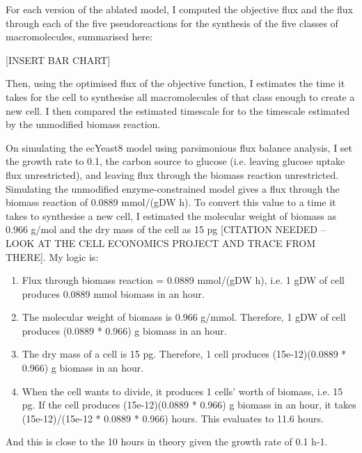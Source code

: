 For each version of the ablated model, I computed the objective flux and the flux through each of the five pseudoreactions for the synthesis of the five classes of macromolecules, summarised here:

[INSERT BAR CHART]

Then, using the optimised flux of the objective function, I estimates the time it takes for the cell to synthesise all macromolecules of that class enough to create a new cell.
I then compared the estimated timescale for to the timescale estimated by the unmodified biomass reaction.

On simulating the ecYeast8 model using parsimonious flux balance analysis, I set the growth rate to 0.1, the carbon source to glucose (i.e. leaving glucose uptake flux unrestricted), and leaving flux through the biomass reaction unrestricted.
Simulating the unmodified enzyme-constrained model gives a flux through the biomass reaction of 0.0889 mmol/(gDW h).
To convert this value to a time it takes to synthesise a new cell, I estimated the molecular weight of biomass as 0.966 g/mol \parencite{takhaveevTemporalSegregationBiosynthetic2023} and the dry mass of the cell as 15 pg [CITATION NEEDED -- LOOK AT THE CELL ECONOMICS PROJECT AND TRACE FROM THERE].
My logic is:
\begin{enumerate}
   \item Flux through biomass reaction = 0.0889 mmol/(gDW h), i.e. 1 gDW of cell produces 0.0889 mmol biomass in an hour.
   \item The molecular weight of biomass is 0.966 g/mmol.  Therefore, 1 gDW of cell produces (0.0889 * 0.966) g biomass in an hour.
   \item The dry mass of a cell is 15 pg.  Therefore, 1 cell produces (15e-12)(0.0889 * 0.966) g biomass in an hour.
   \item When the cell wants to divide, it produces 1 cells' worth of biomass, i.e. 15 pg.  If the cell produces (15e-12)(0.0889 * 0.966) g biomass in an hour, it takes (15e-12)/(15e-12 * 0.0889 * 0.966) hours.  This evaluates to 11.6 hours.
\end{enumerate}
And this is close to the 10 hours in theory given the growth rate of 0.1 h-1.

